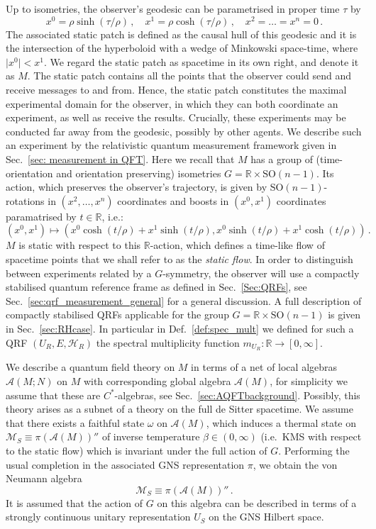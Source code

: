 \documentclass[sn-mathphys-num]{sn-jnl}%
\newcommand{\RR}{\mathbb{R}}
\newcommand{\HH}{\mathcal{H}}
\newcommand{\MM}{\mathcal{M}}
\newcommand{\Af}{\mathscr{A}}
\numberwithin{equation}{section}
\theoremstyle{thmstyleone}%
\theoremstyle{thmstyletwo}%
\theoremstyle{thmstylethree}%
\begin{document}
Up to isometries, the observer's geodesic can be parametrised in proper time $\tau$ by 
\begin{equation}
x^0=\rho \sinh (\tau/\rho)\,,\quad x^1=\rho \cosh (\tau/\rho)\,,\quad x^2=\dots=x^n=0\,.
\end{equation}
The associated static patch is defined as the causal hull of this geodesic and it is the intersection of the hyperboloid with a wedge of Minkowski space-time, where $\vert x^0\vert <x^1$. We regard the static patch as spacetime in its own right, and denote it as $M$. The static patch contains all the points that the observer could send and receive messages to and from. Hence, the static patch constitutes the maximal experimental domain for the observer, in which they can both coordinate an experiment, as well as receive the results. Crucially, these experiments may be conducted far away from the geodesic, possibly by other agents. We describe such an experiment by the relativistic quantum measurement framework given in Sec.\ \ref{sec: measurement in QFT}. Here we recall that $M$ has a group of (time-orientation and orientation preserving) isometries $G=\RR\times \mathrm{SO}(n-1)$. Its action, which preserves the observer's trajectory, is given by $\mathrm{SO}(n-1)$-rotations in $(x^2,\dots,x^n)$ coordinates and boosts in $(x^0,x^1)$ coordinates paramatrised by $t\in\RR$, i.e.:
\begin{equation}
    (x^0,x^1)\mapsto (x^0 \cosh(t/\rho)+x^1 \sinh(t/\rho),x^0 \sinh(t/\rho)+x^1 \cosh(t/\rho))\,.
\end{equation}
$M$ is static with respect to this $\RR$-action, which defines a time-like flow of spacetime points that we shall refer to as the \textit{static flow}. In order to distinguish between experiments related by a $G$-symmetry, the observer will use a compactly stabilised quantum reference frame as defined in Sec.\ \ref{Sec:QRFs}, see Sec.\ \ref{sec:qrf_measurement_general} for a general discussion. A full description of compactly stabilised QRFs applicable for the group $G=\RR\times \mathrm{SO}(n-1)$ is given in Sec.\ \ref{sec:RHcase}. In particular in Def.\ \ref{def:spec_mult} we defined for such a QRF $(U_R,E,\HH_R)$ the spectral multiplicity function $m_{U_R}:\RR\to [0,\infty]$.


 We describe a quantum field theory on $M$ in terms of a net of local algebras $\mathscr{A}(M;N)$ on $M$ with corresponding global algebra $\mathscr{A}(M)$, for simplicity we assume that these are $C^*$-algebras, see Sec.\ \ref{sec:AQFTbackground}. Possibly, this theory arises as a subnet of a theory on the full de Sitter spacetime. We assume
  that there exists a faithful state $\omega$   on $\Af(M)$, which induces a thermal state on
  $\MM_S\equiv \pi(\Af(M))''$ of inverse temperature $\beta\in (0,\infty)$ (i.e.\ KMS with respect to the static flow) which is invariant under the full action of $G$. 
Performing the usual completion in the associated GNS representation $\pi$, we obtain the von Neumann algebra
\begin{equation}
    \MM_S\equiv \pi(\Af(M))''\,.
\end{equation}
It is assumed that the action of $G$ on this algebra can be described in terms of a strongly continuous unitary representation $U_S$ on the GNS Hilbert space. 
\end{document}
